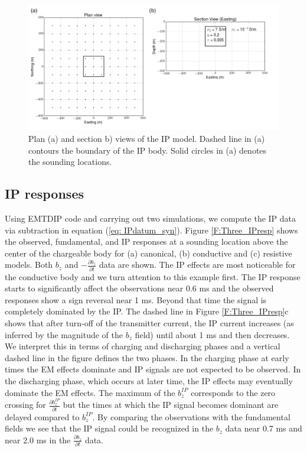 \documentclass[a4paper, 11pt]{article}
\begin{document}
\begin{figure}[htb]
  \centering
  \includegraphics[width=1.0\textwidth]{figures/IPModel.png}
  \caption{Plan (a) and section b) views of the IP model. Dashed line in (a) contours the boundary of the IP body. Solid circles in (a) denotes the sounding locations.}
  \label{F: IPModel}
\end{figure}
\clearpage

\subsection{IP responses}
Using EMTDIP code and carrying out two simulations, we compute the IP data via subtraction in equation (\ref{eq: IPdatum_syn}).
Figure \ref{F:Three_IPresp} shows the observed, fundamental, and IP responses at a sounding location above the center of the chargeable body for (a) canonical, (b) conductive and (c) resistive models. Both $b_z$ and $-\frac{\partial b_z}{\partial t}$ data are shown. 
The IP effects are most noticeable for the conductive body and we turn attention to this example first. The IP response starts to significantly affect the observations near 0.6 ms and the observed responses show a sign reversal near 1 ms. Beyond that time the signal is completely dominated by the IP. The dashed line in Figure \ref{F:Three_IPresp}c shows that after turn-off of the transmitter current,  the IP current increases (as inferred by the magnitude of the $b_z$ field) until about 1 ms and then decreases. We interpret this in terms of charging and discharging phases and a vertical dashed line in the figure defines the two phases. In the charging phase at early times the EM effects dominate and IP signals are not expected to be observed. In the discharging phase, which occurs at  later time, the IP effects may eventually dominate the EM effects. The maximum of the $b_z^{IP}$ corresponds to the zero crossing for $\frac{\partial b_z^{IP}}{\partial t}$ but the times at which the IP signal becomes dominant are delayed compared to $b_z^{IP}$. By comparing the observations with the fundamental fields we see that the IP signal could be recognized in the $b_z$ data near 0.7 ms and near 2.0 ms in the $\frac{\partial b_z}{\partial t}$ data.
\end{document}
